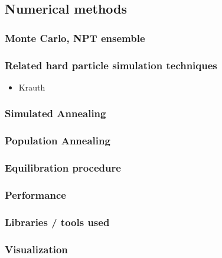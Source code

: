 \documentclass[11pt]{article}
\begin{document}
\subsection{Numerical methods}
\label{sec-6.3}

\subsubsection{Monte Carlo, NPT ensemble}
\label{sec-6.3.1}

\subsubsection{Related hard particle simulation techniques}
\label{sec-6.3.2}

\begin{itemize}

\item Krauth\\
\label{sec-6.3.2.1}

\end{itemize} %
\subsubsection{Simulated Annealing}
\label{sec-6.3.3}

\subsubsection{Population Annealing}
\label{sec-6.3.4}

\subsubsection{Equilibration procedure}
\label{sec-6.3.5}

\subsubsection{Performance}
\label{sec-6.3.6}

\subsubsection{Libraries / tools used}
\label{sec-6.3.7}

\subsubsection{Visualization}
\label{sec-6.3.8}
\end{document}
